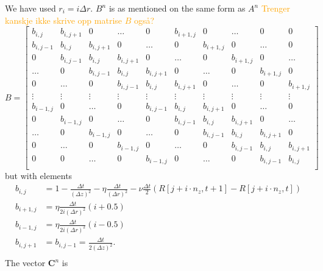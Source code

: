 \documentclass{article}
\begin{document}
We have used $r_i = i \Delta r$. $B^n$ is as mentioned on the same form as $A^n$ \textcolor{orange}{Trenger kanskje ikke skrive opp matrise $B$ også?} 
\\
\begin{equation}
B = 
    \begin{bmatrix}
    b_{i,j} & b_{i,j+1} & 0 & \hdots & 0 & b_{i+1,j} & 0 & \hdots & 0 &  0 \\
    b_{i,j-1} & b_{i,j} & b_{i,j+1} & 0 & \hdots & 0 & b_{i+1,j} & 0 & \hdots & 0 \\
    0 & b_{i,j-1} & b_{i,j} & b_{i,j+1} & 0 & \hdots & 0  & b_{i+1,j} & 0 & \hdots \\
    \hdots & 0 & b_{i,j-1} & b_{i,j} & b_{i,j+1} & 0 & \hdots & 0  & b_{i+1,j} & 0 \\
    0 & \hdots & 0 & b_{i,j-1} & b_{i,j} & b_{i,j+1} & 0 & \hdots & 0  & b_{i+1,j}  \\
    \vdots & \vdots & \vdots &\vdots &\vdots &\vdots &\vdots &\vdots &\vdots &\vdots \\
    b_{i-1,j} & 0 & \hdots & 0 & b_{i,j-1} & b_{i,j} & b_{i,j+1} & 0 & \hdots & 0  \\
    0 & b_{i-1,j} & 0 & \hdots & 0 & b_{i,j-1} & b_{i,j} & b_{i,j+1} & 0 & \hdots \\
    \hdots & 0 & b_{i-1,j} & 0 & \hdots & 0 & b_{i,j-1} & b_{i,j} &  b_{i,j+1} & 0 \\
    0 & \hdots & 0 & b_{i-1,j} & 0 & \hdots & 0 & b_{i,j-1} & b_{i,j} &  b_{i,j+1} \\
    0 & 0 &  \hdots & 0 & b_{i-1,j} & 0 & \hdots & 0 & b_{i,j-1} & b_{i,j} \\
    \end{bmatrix}
\end{equation}
but with elements
\begin{align*}
    b_{i,j} &= 1 - \frac{\Delta t}{(\Delta z)^2} - \eta \frac{\Delta t}{(\Delta r)^2}  - \nu \frac{\Delta t }{2}(R[j + i \cdot n_z,t+1]-R[j + i \cdot n_z,t]) \\
    b_{i+1,j} &=  \eta \frac{\Delta t}{2 i (\Delta r)^2} (i+0.5) \\
    b_{i-1,j} &=  \eta \frac{\Delta t}{2 i (\Delta r)^2} (i-0.5) \\
    b_{i,j+1} &= b_{i,j-1} = \frac{\Delta t }{2 (\Delta z)^2}.\\
\end{align*}
The vector $\boldsymbol{C}^n$ is 
\end{document}
